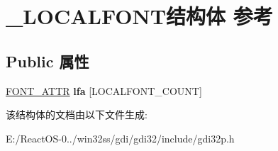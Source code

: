 \hypertarget{struct___l_o_c_a_l_f_o_n_t}{}\section{\+\_\+\+L\+O\+C\+A\+L\+F\+O\+N\+T结构体 参考}
\label{struct___l_o_c_a_l_f_o_n_t}
\subsection*{Public 属性}
\begin{DoxyCompactItemize}
\item 
\mbox{\label{struct___l_o_c_a_l_f_o_n_t_a98412d1b347f3c36ac3fbb518a25310e}} 
\hyperlink{struct___f_o_n_t___a_t_t_r}{F\+O\+N\+T\+\_\+\+A\+T\+TR} {\bfseries lfa} \mbox{[}L\+O\+C\+A\+L\+F\+O\+N\+T\+\_\+\+C\+O\+U\+NT\mbox{]}
\end{DoxyCompactItemize}


该结构体的文档由以下文件生成\+:\begin{DoxyCompactItemize}
\item 
E\+:/\+React\+O\+S-\/0../win32ss/gdi/gdi32/include/gdi32p.\+h\end{DoxyCompactItemize}
